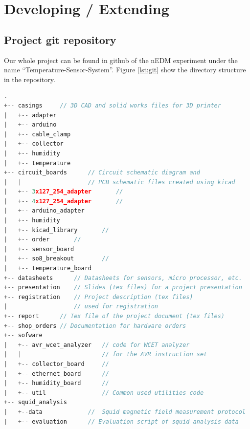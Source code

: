 \documentclass[a4paper]{scrreprt}
\begin{document}
\section{Developing / Extending}
\subsection{Project git repository}
Our whole project can be found in github of the nEDM experiment under the name ``Temperature-Sensor-System''. Figure \ref{lst:git} show the directory structure  in the repository.
\lstset{style=mathstyle}
\begin{lstlisting}[language=c,xleftmargin=25pt, xrightmargin=25pt,framexleftmargin=10pt,framextopmargin=10pt, framexbottommargin=10pt, caption={Directory structure in the project git repository}, label={lst:git}]
.
+-- casings     // 3D CAD and solid works files for 3D printer
|   +-- adapter
|   +-- arduino
|   +-- cable_clamp
|   +-- collector
|   +-- humidity
|   +-- temperature
+-- circuit_boards      // Circuit schematic diagram and 
|   |                   // PCB schematic files created using kicad
|   +-- 3x127_254_adapter       //
|   +-- 4x127_254_adapter       //
|   +-- arduino_adapter
|   +-- humidity
|   +-- kicad_library       //
|   +-- order       // 
|   +-- sensor_board
|   +-- so8_breakout        //
|   +-- temperature_board
+-- datasheets      // Datasheets for sensors, micro processor, etc.
+-- presentation    // Slides (tex files) for a project presentation
+-- registration    // Project description (tex files) 
|                   // used for registration
+-- report      // Tex file of the project document (tex files)
+-- shop_orders // Documentation for hardware orders
+-- sofware
|   +-- avr_wcet_analyzer   // code for WCET analyzer
|   |                       // for the AVR instruction set
|   +-- collector_board     // 
|   +-- ethernet_board      //  
|   +-- humidity_board      //
|   +-- util                // Common used utilities code
+-- squid_analysis      
|   +--data             //  Squid magnetic field measurement protocol
|   +-- evaluation      // Evaluation script of squid analysis data
\end{lstlisting}
\end{document}
